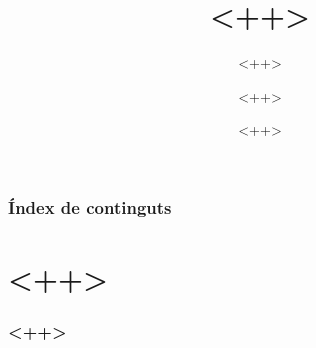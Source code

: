 \documentclass{beamer}
\title[<++>]{<++>}
\subtitle{<++>}
\author{<++>}
\institute[<++>]{<++>}
\date{<++>}
\begin{document}
% 
\frame{\titlepage}

\begin{frame}
	\frametitle{Índex de continguts}
	\tableofcontents
\end{frame}

\section{<++>}

\begin{frame}
	\frametitle{<++>}
\end{frame}
 
%
% 
% 	 
% 	 
% 

\end{document}
